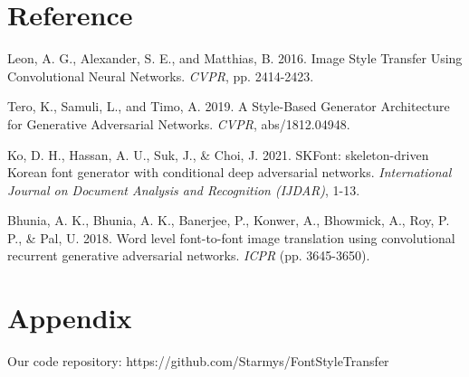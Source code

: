\documentclass[letterpaper]{article}
\begin{document}
\section{Reference}
\smallskip \noindent
Leon, A. G., Alexander, S. E., and Matthias, B. 2016. Image Style Transfer Using Convolutional Neural Networks. \textit{CVPR}, pp. 2414-2423.

\smallskip \noindent
Tero, K., Samuli, L., and Timo, A. 2019. A Style-Based Generator Architecture for Generative Adversarial Networks. \textit{CVPR}, abs/1812.04948.

\smallskip \noindent
Ko, D. H., Hassan, A. U., Suk, J., \& Choi, J. 2021. SKFont: skeleton-driven Korean font generator with conditional deep adversarial networks. \textit{International Journal on Document Analysis and Recognition (IJDAR)}, 1-13.

\smallskip \noindent
Bhunia, A. K., Bhunia, A. K., Banerjee, P., Konwer, A., Bhowmick, A., Roy, P. P., \& Pal, U. 2018. Word level font-to-font image translation using convolutional recurrent generative adversarial networks. \textit{ICPR} (pp. 3645-3650).


\section{Appendix}
Our code repository: https://github.com/Starmys/FontStyleTransfer



\end{document}
